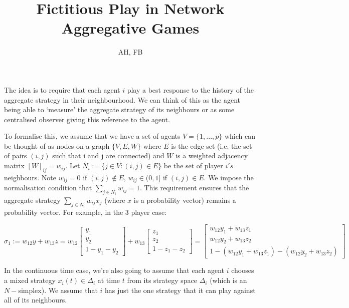 \documentclass{article}
\title{Fictitious Play in Network Aggregative Games}
\author{AH, FB}
\theoremstyle{definition}
\begin{document}
	
	\maketitle
	
	The idea is to require that each agent $i$ play a best response to the history of the aggregate strategy in their neighbourhood. We can think of this as the agent being able to `measure' the aggregate strategy of its neighbours or as some centralised observer giving this reference to the agent.
	
	To formalise this, we assume that we have a set of agents $V = \{1, ..., p \}$ which can be thought of as nodes on a graph $\{V, E, W\}$ where $E$ is the edge-set (i.e. the set of pairs $(i, j)$ such that i and j are connected) and $W$ is a weighted adjacency matrix $[W]_{ij} = w_{ij}$. Let $N_i := \{j \in V : (i, j) \in E\}$ be the set of player $i's$ neighbours. Note $w_{ij} = 0$ if $(i, j) \not\in E$, $w_{ij} \in (0, 1]$ if $(i, j) \in E$. We impose the normalisation condition that $\sum_{j \in N_i} w_{ij} = 1$. This requirement ensures that the aggregate strategy $\sum_{j \in N_i} w_{ij} x_j$ (where $x$ is a probability vector) remains a probability vector. For example, in the 3 player case:
	
	\begin{equation}
	\sigma_1 := w_{12} y + w_{13} z = 
	w_{12}
	\begin{bmatrix}
	y_1 \\ y_2 \\ 1 - y_1 - y_2
	\end{bmatrix}		
	+ 	w_{13}
	\begin{bmatrix}
	z_1 \\ z_2 \\ 1 - z_1 - z_2
	\end{bmatrix}	= 
	\begin{bmatrix}
	w_{12} y_1 + w_{13} z_1 \\ w_{12} y_2 + w_{13} z_2 \\ 1 - (w_{12} y_1 + w_{13} z_1) - (w_{12} y_2 + w_{13} z_2)
	\end{bmatrix}	
	\end{equation}
	
	In the continuous time case, we're also going to assume that each agent $i$ chooses a mixed strategy $x_i(t) \in \Delta_i$ at time $t$ from its strategy space $\Delta_i$ (which is an $N-$simplex). We assume that $i$ has just the one strategy that it can play against all of its neighbours.
	
\end{document}
